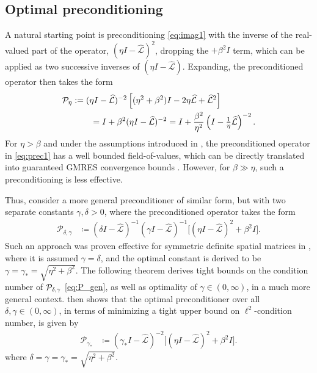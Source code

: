 \documentclass[review]{siamart}
\begin{document}
\subsection{Optimal preconditioning}\label{sec:solve:gamma}

A natural starting point is preconditioning \eqref{eq:imag1} with the inverse of
the real-valued part of the operator, $(\eta I - \widehat{\mathcal{L}})^2$,
dropping the $+ \beta^2 I$ term, which can be applied as two successive inverses
of $(\eta I - \widehat{\mathcal{L}})$. Expanding, the preconditioned operator
then takes the form
%
\begin{align}\nonumber
\mathcal{P}_\eta & := (\eta I - \widehat{\mathcal{L}})^{-2}
	\left[(\eta^2+\beta^2)I - 2\eta \widehat{\mathcal{L}} + \widehat{\mathcal{L}}^2\right]  \\
&\hspace{5ex} = I + \beta^2(\eta I - \widehat{\mathcal{L}})^{-2}
= I + \frac{\beta^2}{\eta^2}\left(I - \tfrac{1}{\eta}\widehat{\mathcal{L}}\right)^{-2}.\label{eq:prec1}
\end{align}
%
For $\eta > \beta$ and under the assumptions introduced in ,
the preconditioned operator in \eqref{eq:prec1} has a well bounded field-of-values,
which can be directly translated into guaranteed GMRES convergence bounds
\cite{liesen2012field}. However, for $\beta \gg \eta$, such a preconditioning
is less effective. 

Thus, consider a more general preconditioner of similar form, but with two separate
constants $\gamma,\delta > 0$, where the preconditioned operator takes the form
%
\begin{align}\label{eq:P_gen}
\mathcal{P}_{\delta,\gamma} & \coloneqq
	(\delta I - \widehat{\mathcal{L}})^{-1}(\gamma I - \widehat{\mathcal{L}})^{-1}
		\Big[(\eta I - \widehat{\mathcal{L}})^2 + \beta^2 I\Big].
\end{align}
%
Such an approach was proven effective for symmetric definite spatial matrices in
\cite{exh}, where it is assumed $\gamma = \delta$, and the optimal constant is
derived to be $\gamma = \gamma_* = \sqrt{\eta^2+\beta^2}$. The following
theorem derives tight bounds on the condition number of ${\cal P}_{\delta,\gamma}$ 
\eqref{eq:P_gen}, as well as optimality of $\gamma\in(0,\infty)$, in a much
more general context.   then shows that the optimal preconditioner 
over all $\delta,\gamma\in(0,\infty)$, in terms of minimizing a tight upper bound
on $\ell^2$-condition number, is given by 
%
\begin{align}\label{eq:P_gamma}
\mathcal{P}_{\gamma_*} & \coloneqq
	(\gamma_* I - \widehat{\mathcal{L}})^{-2}
		\Big[(\eta I - \widehat{\mathcal{L}})^2 + \beta^2 I\Big].
\end{align}
%
where $\delta = \gamma = \gamma_* = \sqrt{\eta^2+\beta^2}$.
\end{document}
